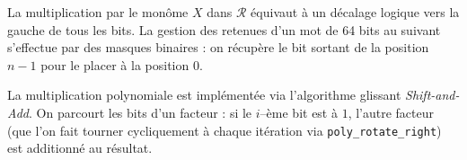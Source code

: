 \documentclass[11pt,a4paper]{article}
\begin{document}
La multiplication par le monôme $X$ dans $\mathcal{R}$ équivaut à un décalage
logique vers la gauche de tous les bits. La gestion des retenues d'un mot de 64
bits au suivant s'effectue par des masques binaires :
on récupère le bit sortant de la position $n-1$ pour le placer à la position
$0$.

La multiplication polynomiale est implémentée via l'algorithme glissant
\emph{Shift-and-Add}. On parcourt les bits d'un facteur : si le $i$--ème
bit est à $1$, l'autre facteur (que l'on fait tourner cycliquement à chaque
itération via \texttt{poly\_rotate\_right}) est additionné au résultat.

\end{document}
